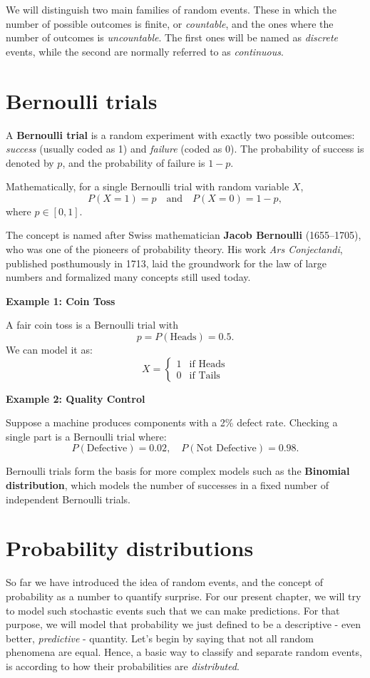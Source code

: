 \documentclass{book}
\begin{document}
We will distinguish two main families of random events. These in which the number of possible outcomes is finite, or \textit{countable}, and the ones where the number of outcomes is \textit{uncountable}. The first ones will be named as \textit{discrete} events, while the second are normally referred to as \textit{continuous}.

\newpage

\section{Bernoulli trials}

A \textbf{Bernoulli trial} is a random experiment with exactly two possible outcomes: \emph{success} (usually coded as 1) and \emph{failure} (coded as 0). The probability of success is denoted by \( p \), and the probability of failure is \( 1 - p \).

Mathematically, for a single Bernoulli trial with random variable \( X \),
\[
P(X = 1) = p \quad \text{and} \quad P(X = 0) = 1 - p,
\]
where \( p \in [0, 1] \).

The concept is named after Swiss mathematician \textbf{Jacob Bernoulli} (1655–1705), who was one of the pioneers of probability theory. His work \emph{Ars Conjectandi}, published posthumously in 1713, laid the groundwork for the law of large numbers and formalized many concepts still used today.

\textbf{Example 1: Coin Toss}

A fair coin toss is a Bernoulli trial with
\[
p = P(\text{Heads}) = 0.5.
\]
We can model it as:
\[
X = 
\begin{cases}
1 & \text{if Heads} \\
0 & \text{if Tails}
\end{cases}
\]

\textbf{Example 2: Quality Control}

Suppose a machine produces components with a 2\% defect rate. Checking a single part is a Bernoulli trial where:
\[
P(\text{Defective}) = 0.02, \quad P(\text{Not Defective}) = 0.98.
\]

Bernoulli trials form the basis for more complex models such as the \textbf{Binomial distribution}, which models the number of successes in a fixed number of independent Bernoulli trials.

\newpage

\section{Probability distributions}
So far we have introduced the idea of random events, and the concept of probability as a number to quantify surprise. For our present chapter, we will try to model such stochastic events such that we can make predictions. For that purpose, we will model that probability we just defined to be a descriptive - even better, \textit{predictive} - quantity. Let's begin by saying that not all random phenomena are equal. Hence, a basic way to classify and separate random events, is according to how their probabilities are \textit{distributed}.
\end{document}
